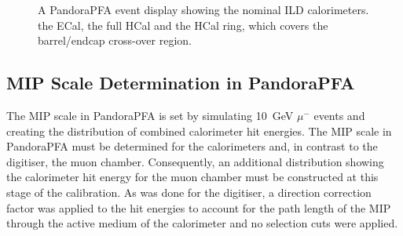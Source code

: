 \begin{figure}[h!]
\caption[A PandoraPFA event display showing the nominal ILD calorimeters.  \protect{} the ECal, \protect{} the full HCal and \protect{} the HCal ring, which covers the barrel/endcap cross-over region.]{A PandoraPFA event display showing the nominal ILD calorimeters.  \protect{} the ECal, \protect{} the full HCal and \protect{} the HCal ring, which covers the barrel/endcap cross-over region.}
\label{fig:calorimeters}
\end{figure}


\subsection{MIP Scale Determination in PandoraPFA}
The MIP scale in PandoraPFA is set by simulating 10~GeV $\mu^{-}$ events and creating the distribution of combined calorimeter hit energies.  The MIP scale in PandoraPFA must be determined for the calorimeters and, in contrast to the digitiser, the muon chamber.  Consequently, an additional distribution showing the calorimeter hit energy for the muon chamber must be constructed at this stage of the calibration.  As was done for the digitiser, a direction correction factor was applied to the hit energies to account for the path length of the MIP through the active medium of the calorimeter and no selection cuts were applied.  

